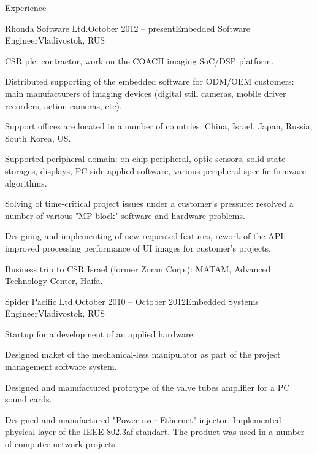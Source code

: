 \documentclass{template}
\begin{document}
\begin{rSection}{Experience}

\begin{rCompany}{Rhonda Software Ltd.}{October 2012 -- present}{Embedded Software Engineer}{Vladivostok, RUS}
\item CSR plc. contractor, work on the COACH imaging SoC/DSP platform.
\item Distributed supporting of the embedded software for ODM/OEM customers: main manufacturers of imaging devices (digital still cameras, mobile driver recorders, action cameras, etc).
\item Support offices are located in a number of countries: China, Israel, Japan, Russia, South Korea, US.
\item Supported peripheral domain: on-chip peripheral, optic sensors, solid state storages, displays, PC-side applied software, various peripheral-specific firmware algorithms.
\item Solving of time-critical project issues under a customer's pressure: resolved a number of various "MP block" software and hardware problems.
\item Designing and implementing of new requested features, rework of the API: improved processing performance of UI images for customer's projects.
\item Business trip to CSR Israel (former Zoran Corp.): MATAM, Advanced Technology Center, Haifa.
\end{rCompany}

\begin{rCompany}{Spider Pacific Ltd.}{October 2010 -- October 2012}{Embedded Systems Engineer}{Vladivostok, RUS}
\item Startup for a development of an applied hardware.
\item Designed maket of the mechanical-less manipulator as part of the project management software system.
\item Designed and manufactured prototype of the valve tubes amplifier for a PC sound cards.
\item Designed and manufactured "Power over Ethernet" injector. Implemented physical layer of the IEEE 802.3af standart. The product was used in a number of computer network projects.
\end{rCompany}

\end{rSection}

\end{document}
